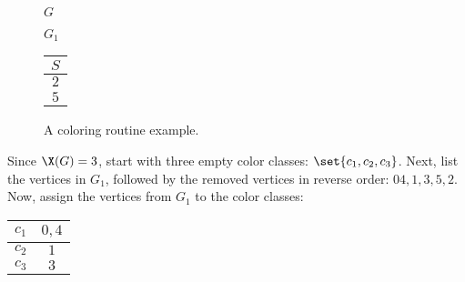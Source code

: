 \begin{figure}[H]
  \begin{minipage}{2.5in}
    \centering

    \(G\)
  \end{minipage}
  \begin{minipage}{2in}
    \centering

    \(G_1\)
  \end{minipage}
  \begin{minipage}{1in}
    \begin{tabular}{|c|}
      \hline
      \(S\) \\
      \hline
      \(2\) \\
      \(5\) \\
      \hline
    \end{tabular}
  \end{minipage}
  \caption{A coloring routine example.}
  \label{fig:crex}
\end{figure}

Since \(\X(G)=3\), start with three empty color classes: \(\set{c_1,c_2,c_3}\).  Next, list the vertices in
\(G_1\), followed by the removed vertices in reverse order: \(04,1,3,5,2\).  Now, assign the vertices from \(G_1\)
to the color classes:

\begin{center}
  \begin{tabular}{|c|c|}
    \hline
    \(c_1\) & \(0,4\) \\
    \hline
    \(c_2\) & \(1\) \\
    \hline
    \(c_3\) & \(3\) \\
    \hline
  \end{tabular}
\end{center}

